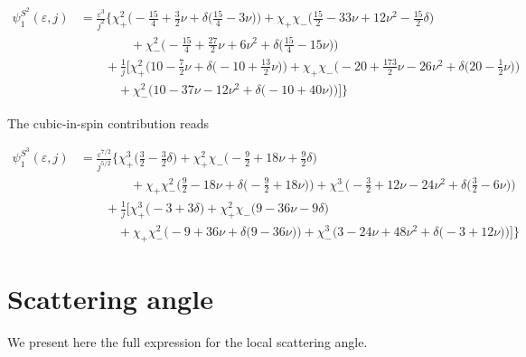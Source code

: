 \documentclass[prd,superscriptaddress,preprintnumbers,tightenlines,nofootinbib, eqsecnum]{revtex4-2}
\newcommand{\nn}{\nonumber}
\begin{document}
\begin{align}
\psi_1^{S^2}(\varepsilon,j) &= \frac{\varepsilon^{3}}{j^{2}}\Bigg\{
\chi_{+}^{2}\Bigg(-\frac{15}{4} + \frac{3}{2}\nu + \delta\bigg(\frac{15}{4} - 3 \nu\bigg)\Bigg)  + \chi_{+}\chi_{-}\Bigg(\frac{15}{2} - 33 \nu + 12 \nu^{2} - \frac{15}{2}\delta\Bigg) \nn \\
&\qquad\qquad + \chi_{-}^{2}\Bigg(-\frac{15}{4} + \frac{27}{2}\nu + 6 \nu^{2} + \delta\bigg(\frac{15}{4} - 15 \nu\bigg)\Bigg) \nn \\
&\qquad + \frac{1}{j}\Bigg[\chi_{+}^{2}\Bigg(10 - \frac{7}{2}\nu + \delta\bigg(-10 + \frac{13}{2}\nu\bigg)\Bigg)   + \chi_{+}\chi_{-}\Bigg(-20 + \frac{173}{2}\nu - 26 \nu^{2} + \delta\bigg(20 - \frac{1}{2}\nu\bigg)\Bigg) \nn \\
&\qquad\quad + \chi_{-}^{2}\Bigg(10 - 37 \nu - 12 \nu^{2} + \delta\bigg(-10 + 40 \nu\bigg)\Bigg)\Bigg]\Bigg\}
\end{align}

The cubic-in-spin contribution reads

\begin{align}
\psi_1^{S^3}(\varepsilon,j) &= \frac{\varepsilon^{7/2}}{j^{5/2}}\Bigg\{
\chi_{+}^{3}\Bigg(\frac{3}{2} - \frac{3}{2}\delta\Bigg)   + \chi_{+}^{2}\chi_{-}\Bigg(-\frac{9}{2} + 18 \nu + \frac{9}{2}\delta\Bigg) \nn \\
&\qquad\qquad + \chi_{+}\chi_{-}^{2}\Bigg(\frac{9}{2} - 18 \nu + \delta\bigg(-\frac{9}{2} + 18 \nu\bigg)\Bigg)  + \chi_{-}^{3}\Bigg(-\frac{3}{2} + 12 \nu - 24 \nu^{2} + \delta\bigg(\frac{3}{2} - 6 \nu\bigg)\Bigg) \nn \\
&\qquad + \frac{1}{j}\Bigg[\chi_{+}^{3}\Bigg(-3 + 3\delta\Bigg)  + \chi_{+}^{2}\chi_{-}\Bigg(9 - 36 \nu - 9\delta\Bigg) \nn \\
&\qquad\quad + \chi_{+}\chi_{-}^{2}\Bigg(-9 + 36 \nu + \delta\bigg(9 - 36 \nu\bigg)\Bigg)  + \chi_{-}^{3}\Bigg(3 - 24 \nu + 48 \nu^{2} + \delta\bigg(-3 + 12 \nu\bigg)\Bigg)\Bigg]\Bigg\}
\end{align}

\section{Scattering angle}
\label{app:scattering}

We present here the full expression for the local scattering angle. 
\end{document}
